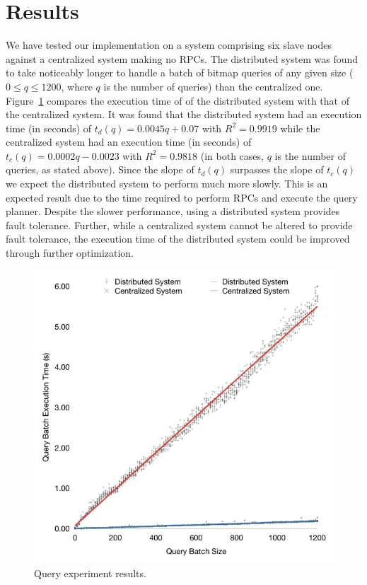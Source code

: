 \section{Results}
We have tested our implementation on a system comprising six slave nodes
against a centralized system making no RPCs. The distributed system was found
to take noticeably longer to handle a batch of bitmap queries of any given size
(\(0 \leq q \leq 1200\), where \(q\) is the number of queries) than the
centralized one. Figure~\ref{fig:graph-of-results} compares the execution time
of of the distributed system with that of the centralized system. It was found
that the distributed system had an execution time (in seconds) of
\(t_d(q) = 0.0045q + 0.07\) with \(R^2 = 0.9919\) while the centralized system
had an execution time (in seconds) of \(t_c(q) = 0.0002q - 0.0023\) with
\(R^2 = 0.9818\) (in both cases, \(q\) is the number of queries, as stated
above). Since the slope of \(t_d(q)\) surpasses the slope of \(t_c(q)\) we
expect the distributed system to perform much more slowly. This is an expected
result due to the time required to perform RPCs and execute the query planner.
Despite the slower performance, using a distributed system provides fault
tolerance. Further, while a centralized system cannot be altered to provide
fault tolerance, the execution time of the distributed system could be improved
through further optimization.
%
\begin{figure}
    \centering
    \includegraphics[width=\columnwidth]{query-experiment-results}
    \caption{Query experiment results.}\label{fig:graph-of-results}
\end{figure}
